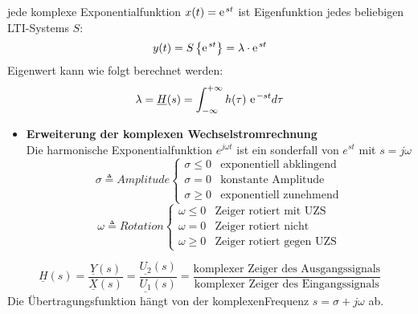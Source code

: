 \begin{mdframed}[style=exercise]
  jede komplexe Exponentialfunktion $x(t) = \e^{st}$ ist Eigenfunktion
  jedes beliebigen LTI-Systems $S$:
  \[
      y(t) = S\left\{ \e^{st} \right\} = \lambda\cdot \e^{st}
  \]
  Eigenwert kann wie folgt berechnet werden:
  \[
      \lambda = \underline{H}(s) = \int_{-\infty}^{+\infty} h(\tau)\  \e^{-st} d\tau
  \]
  \begin{itemize}
      \item{\textbf{Erweiterung der komplexen Wechselstromrechnung}}\\
          Die harmonische Exponentialfunktion $e^{j\omega t}$ ist ein
          sonderfall von $e^{st}$ mit $s=j\omega$
          \[
              \sigma \triangleq Amplitude
              \begin{cases}
                  \sigma \leq 0 & \text{exponentiell abklingend}\\
                  \sigma = 0 & \text{konstante Amplitude}\\
                  \sigma \geq 0 & \text{exponentiell zunehmend}
              \end{cases}
          \]
          \[
              \omega \triangleq Rotation
              \begin{cases}
                  \omega \leq 0 & \text{Zeiger rotiert mit UZS}\\
                  \omega = 0 & \text{Zeiger rotiert nicht}\\
                  \omega \geq 0 & \text{Zeiger rotiert gegen UZS}
              \end{cases}
          \]
  \end{itemize}
\end{mdframed}

\begin{mdframed}[style=exercise,frametitle=Komplexe \"Ubertragungsfunktion]
  \footnotesize
  \[
      \underline{H}(s)=\frac{\underline{Y}(s)}{\underline{X}(s)}=\frac{\underline{U_2}(s)}{\underline{U_1}(s)}=\frac{\text{komplexer
      Zeiger des Ausgangssignals}}{\text{komplexer Zeiger des
      Eingangssignals}}
  \]
  \normalsize
  Die Übertragungsfunktion hängt von der komplexen\linebreak Frequenz
  $s=\sigma+j\omega$ ab.
\end{mdframed}

